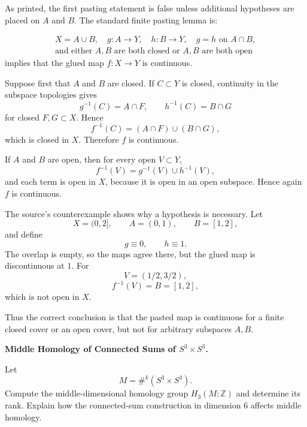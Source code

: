 \begin{solution}
As printed, the first pasting statement is false unless additional hypotheses are placed on
\(A\) and \(B\). The standard finite pasting lemma is:

\[
\boxed{
\begin{array}{l}
X=A\cup B,\quad g:A\to Y,\quad h:B\to Y,\quad g=h\text{ on }A\cap B,\\
\text{and either }A,B\text{ are both closed or }A,B\text{ are both open}
\end{array}}
\]
implies that the glued map \(f:X\to Y\) is continuous.

Suppose first that \(A\) and \(B\) are closed. If \(C\subset Y\) is closed, continuity in the
subspace topologies gives
\[
g^{-1}(C)=A\cap F,
\qquad
h^{-1}(C)=B\cap G
\]
for closed \(F,G\subset X\). Hence
\[
f^{-1}(C)
=
(A\cap F)\cup(B\cap G),
\]
which is closed in \(X\). Therefore \(f\) is continuous.

If \(A\) and \(B\) are open, then for every open \(V\subset Y\),
\[
f^{-1}(V)
=
g^{-1}(V)\cup h^{-1}(V),
\]
and each term is open in \(X\), because it is open in an open subspace. Hence again \(f\)
is continuous.

The source's counterexample shows why a hypothesis is necessary. Let
\[
X=(0,2],\qquad
A=(0,1),\qquad
B=[1,2],
\]
and define
\[
g\equiv0,\qquad h\equiv1.
\]
The overlap is empty, so the maps agree there, but the glued map is discontinuous at \(1\).
For
\[
V=(1/2,3/2),
\]
\[
f^{-1}(V)=B=[1,2],
\]
which is not open in \(X\).

Thus the correct conclusion is that the pasted map is continuous for a finite closed cover
or an open cover, but not for arbitrary subspaces \(A,B\).
\end{solution}


\begin{problem}[CP-II-0406]
\label{prob:cp-ii-0406}
\textbf{Middle Homology of Connected Sums of \(S^3\times S^3\).}

\hspace*{1.5em}Let
\[
M=\#^k(S^3\times S^3).
\]
Compute the middle-dimensional homology group \(H_3(M;\mathbb Z)\) and determine
its rank. Explain how the connected-sum construction in dimension \(6\) affects
middle homology.
\end{problem}

